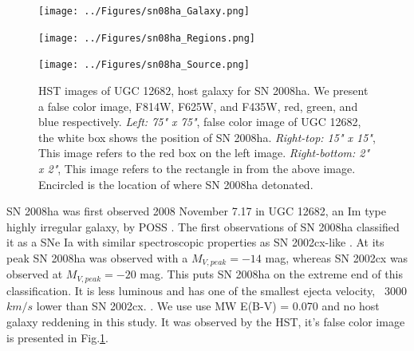\documentclass[preprint]{aastex}
\begin{document}
\begin{centering}
	\begin{figure}
	\begin{minipage}[c][8cm]{.5\textwidth}
		\vspace*{\fill}
		\centering
		\texttt{[image: ../Figures/sn08ha\_Galaxy.png]}
			\label{fig:08hagal}
	\end{minipage}
	\begin{minipage}[c][8cm]{.5\textwidth}
		\vspace*{-.5cm}
		\centering
		\hspace*{-4.15cm}\texttt{[image: ../Figures/sn08ha\_Regions.png]}
			\label{fig:r08ha}\par
		\hspace*{-4.15cm}\texttt{[image: ../Figures/sn08ha\_Source.png]}
	\label{fig:s08ha}
	\end{minipage}
	\caption{HST images of UGC 12682, host galaxy for SN 2008ha. We present a false color image,
	 F814W, F625W, and F435W, red, green, and blue respectively. \textit{Left: 75" x 75"}, false color image of 
	UGC 12682, the white box shows the position of SN 2008ha. \textit{Right-top: 15" x 15"},
	This image refers to the red box on the left image. 
	\textit{Right-bottom: 2" x 2"}, This image refers to the rectangle in from the above image. 
	Encircled is the location of where SN 2008ha detonated.}
	\label{fig:08ha_whole}
	\end{figure}  
\end{centering}


SN 2008ha was first observed 2008 November 7.17 in UGC 12682, 
an Im type highly irregular galaxy, by POSS \citep{puc08}.
The first observations of SN 2008ha classified it as 
a SNe Ia with similar spectroscopic properties as SN 2002cx-like \citep{fol08}. 
At its peak SN 2008ha was observed with a $M_{V,peak} = -14$ mag, 
whereas SN 2002cx was observed at  $M_{V,peak} = -20$ mag. 
This puts SN 2008ha on the extreme end of this classification. 
It is less luminous and has one of the smallest ejecta velocity, ~3000$km/s$ lower than SN 2002cx. 
 \citep{fol09,fol1001,val09}.
We use use MW E(B-V) = 0.070 and no host galaxy reddening in this study. 
It was observed by the HST, it's false color image is presented in Fig.\ref{fig:08ha_whole}.
\end{document}
